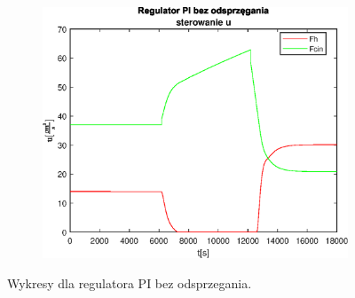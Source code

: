 \begin{figure}[h!]
   \begin{subfigure}[b]{0.4\textwidth}
      \includegraphics[width=1\linewidth]{img/PI/noDecoupler/noDisturbance/PINoDecouplerControl3Linfalse.eps}
      \caption{}
      \label{fig:fig:PINodDecoupler3Linfalse3}
   \end{subfigure}
       
   \caption{Wykresy dla regulatora PI bez odsprzegania.}
   \label{fig:PINodDecoupler3Linfalse}
\end{figure}
           
